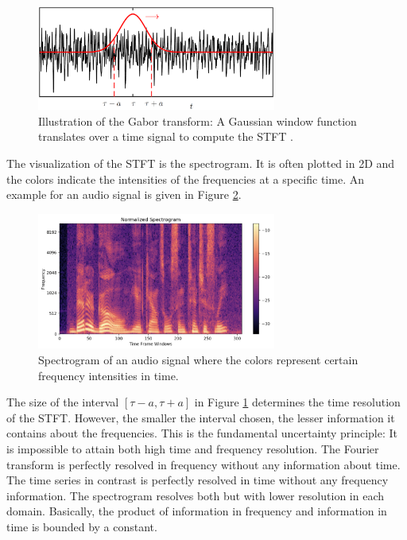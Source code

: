 \documentclass{usiinftr}
\begin{document}
\begin{figure}[h] 
\centering
\includegraphics[width=0.7\textwidth]{figures/Gabor.png}
\caption{Illustration of the Gabor transform: A Gaussian window function translates over a time signal to compute the STFT \cite{brunton_kutz_2019}.}
\label{Gabor_transform}
\end{figure}

The visualization of the STFT is the spectrogram.
It is often plotted in 2D and the colors indicate the intensities of the frequencies at a specific time.
An example for an audio signal is given in Figure \ref{Spectrogram}.

\begin{figure}[h] 
\centering
\includegraphics[width=0.7\textwidth]{figures/spectrogram.png}
\caption{Spectrogram of an audio signal where the colors represent certain frequency intensities in time\cite{Spectrogram}. }
\label{Spectrogram}
\end{figure}

The size of the interval $[\tau -a, \tau +a]$ in Figure \ref{Gabor_transform} determines the time resolution of the STFT.
However, the smaller the interval chosen, the lesser information it contains about the frequencies.
This is the fundamental uncertainty principle: It is impossible to attain both high time and frequency resolution.
The Fourier transform is perfectly resolved in frequency without any information about time.
The time series in contrast is perfectly resolved in time without any frequency information.
The spectrogram resolves both but with lower resolution in each domain.
Basically, the product of information in frequency and information in time is bounded by a constant\cite{brunton_kutz_2019}.
\end{document}
